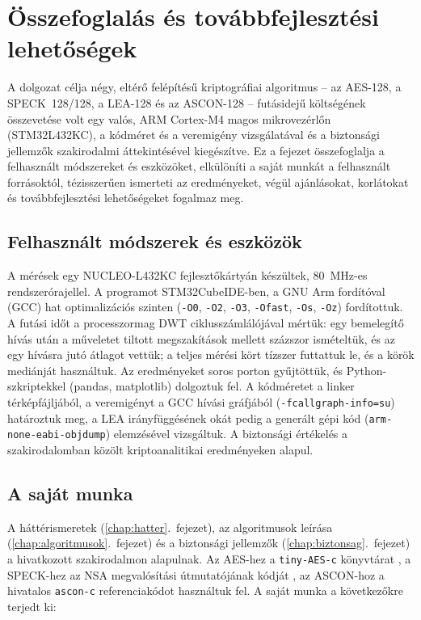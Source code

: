 \documentclass[a4paper,12pt]{report}
\theoremstyle{definition}
\theoremstyle{remark}
\begin{document}
\chapter{Összefoglalás és továbbfejlesztési lehetőségek}\label{chap:osszefoglalas}

A dolgozat célja négy, eltérő felépítésű kriptográfiai algoritmus -- az AES-128, a SPECK~128/128, a LEA-128 és az ASCON-128 -- futásidejű költségének összevetése volt egy valós, ARM Cortex-M4 magos mikrovezérlőn (STM32L432KC), a kódméret és a veremigény vizsgálatával és a biztonsági jellemzők szakirodalmi áttekintésével kiegészítve. Ez a fejezet összefoglalja a felhasznált módszereket és eszközöket, elkülöníti a saját munkát a felhasznált forrásoktól, tézisszerűen ismerteti az eredményeket, végül ajánlásokat, korlátokat és továbbfejlesztési lehetőségeket fogalmaz meg.

\section{Felhasznált módszerek és eszközök}

A mérések egy NUCLEO-L432KC fejlesztőkártyán készültek, 80~MHz-es rendszerórajellel. A programot STM32CubeIDE-ben, a GNU Arm fordítóval (GCC) hat optimalizációs szinten (\texttt{-O0}, \texttt{-O2}, \texttt{-O3}, \texttt{-Ofast}, \texttt{-Os}, \texttt{-Oz}) fordítottuk. A futási időt a processzormag DWT ciklusszámlálójával mértük: egy bemelegítő hívás után a műveletet tiltott megszakítások mellett százszor ismételtük, és az egy hívásra jutó átlagot vettük; a teljes mérési kört tízszer futtattuk le, és a körök mediánját használtuk. Az eredményeket soros porton gyűjtöttük, és Python-szkriptekkel (pandas, matplotlib) dolgoztuk fel. A kódméretet a linker térképfájljából, a veremigényt a GCC hívási gráfjából (\texttt{-fcallgraph-info=su}) határoztuk meg, a LEA irányfüggésének okát pedig a generált gépi kód (\texttt{arm-none-eabi-objdump}) elemzésével vizsgáltuk. A biztonsági értékelés a szakirodalomban közölt kriptoanalitikai eredményeken alapul.

\section{A saját munka}

A háttérismeretek (\ref{chap:hatter}.~fejezet), az algoritmusok leírása (\ref{chap:algoritmusok}.~fejezet) és a biztonsági jellemzők (\ref{chap:biztonsag}.~fejezet) a hivatkozott szakirodalmon alapulnak. Az AES-hez a \texttt{tiny-AES-c} könyvtárat \cite{TinyAES}, a SPECK-hez az NSA megvalósítási útmutatójának kódját \cite{Beaulieu2019}, az ASCON-hoz a hivatalos \texttt{ascon-c} referenciakódot \cite{AsconC} használtuk fel. A saját munka a következőkre terjedt ki:
\end{document}
